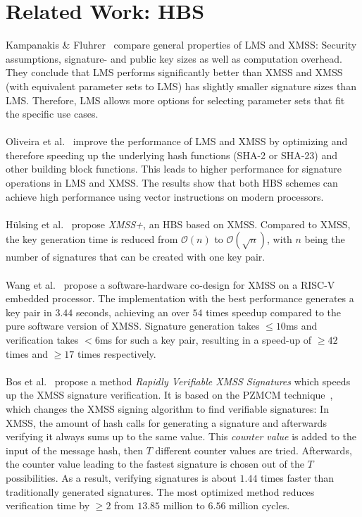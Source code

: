 \section{Related Work: HBS}
Kampanakis \& Fluhrer~\cite{comparison_xmss_lms_2017} compare general properties of LMS and XMSS: Security assumptions, signature- and public key sizes as well as computation overhead. They conclude that LMS performs significantly better than XMSS and XMSS (with equivalent parameter sets to LMS) has slightly smaller signature sizes than LMS. Therefore, LMS allows more options for selecting parameter sets that fit the specific use cases.
\\ \\
Oliveira et al.~\cite{perform_HBS_lms_xmss_2017} improve the performance of LMS and XMSS by optimizing and therefore speeding up the underlying hash functions (SHA-2 or SHA-23) and other building block functions. This leads to higher performance for signature operations in LMS and XMSS. The results show that both HBS schemes can achieve high performance using vector instructions on modern processors.
\\ \\
Hülsing et al.~\cite{xmss+_2018} propose \textit{XMSS+}, an HBS based on XMSS. Compared to XMSS, the key generation time is reduced from $\mathcal{O}(n)$ to $\mathcal{O}(\sqrt{n})$, with $n$ being the number of signatures that can be created with one key pair.
\\  \\
Wang et al.~\cite{xmss_embedded_systems_2020} propose a software-hardware co-design for XMSS on a RISC-V embedded processor. The implementation with the best performance generates a key pair in $3.44$ seconds, achieving an over $54$ times speedup compared to the pure software version of XMSS. Signature generation takes $\leq 10$ms and verification takes $< 6$ms for such a key pair, resulting in a speed-up of $\geq 42$ times and $\geq 17$ times respectively. 
\\ \\
Bos et al.~\cite{xmss_rapidly_verif_sign_2020} propose a method \textit{Rapidly Verifiable XMSS Signatures} which speeds up the XMSS signature verification. It is based on the PZMCM technique~\cite{PZMCM_speedup_wots_2018}, which changes the XMSS signing algorithm to find verifiable signatures: In XMSS, the amount of hash calls for generating a signature and afterwards verifying it always sums up to the same value. This \textit{counter value} is added to the input of the message hash, then $T$ different counter values are tried. Afterwards, the counter value leading to the fastest signature is chosen out of the $T$ possibilities. As a result, verifying signatures is about $1.44$ times faster than traditionally generated signatures. The most optimized method reduces verification time by $\geq 2$ from $13.85$ million to $6.56$ million cycles.
